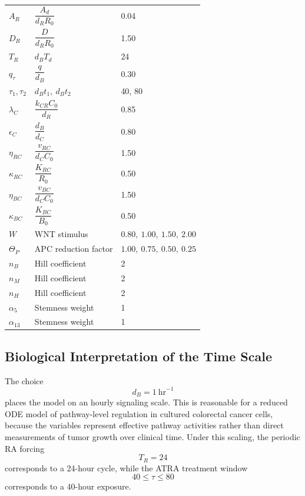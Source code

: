 \documentclass[11pt]{article}
\begin{document}
\begin{longtable}{lll}
$A_R$ & $\dfrac{A_d}{d_RR_0}$ & 0.04\\
$D_R$ & $\dfrac{D}{d_RR_0}$ & 1.50\\
$T_R$ & $d_BT_d$ & 24\\
$q_\tau$ & $\dfrac{q}{d_B}$ & 0.30\\
$\tau_1,\tau_2$ & $d_Bt_1,\ d_Bt_2$ & 40, 80\\
$\lambda_C$ & $\dfrac{k_{CR}C_0}{d_R}$ & 0.85\\
$\epsilon_C$ & $\dfrac{d_B}{d_C}$ & 0.80\\
$\eta_{RC}$ & $\dfrac{v_{RC}}{d_CC_0}$ & 1.50\\
$\kappa_{RC}$ & $\dfrac{K_{RC}}{R_0}$ & 0.50\\
$\eta_{BC}$ & $\dfrac{v_{BC}}{d_CC_0}$ & 1.50\\
$\kappa_{BC}$ & $\dfrac{K_{BC}}{B_0}$ & 0.50\\

$W$ & WNT stimulus & $0.80,\ 1.00,\ 1.50,\ 2.00$\\
$\Theta_P$ & APC reduction factor & $1.00,\ 0.75,\ 0.50,\ 0.25$\\

$n_B$ & Hill coefficient & 2\\
$n_M$ & Hill coefficient & 2\\
$n_H$ & Hill coefficient & 2\\
$\alpha_5$ & Stemness weight & 1\\
$\alpha_{13}$ & Stemness weight & 1\\

\end{longtable}


\subsection{Biological Interpretation of the Time Scale}

The choice
\[
d_B=1\ \mathrm{hr}^{-1}
\]
places the model on an hourly signaling scale. This is reasonable for a reduced
ODE model of pathway-level regulation in cultured colorectal cancer cells, because
the variables represent effective pathway activities rather than direct measurements
of tumor growth over clinical time. Under this scaling, the periodic RA forcing
\[
T_R=24
\]
corresponds to a 24-hour cycle, while the ATRA treatment window
\[
40\leq \tau \leq 80
\]
corresponds to a 40-hour exposure.
\end{document}
